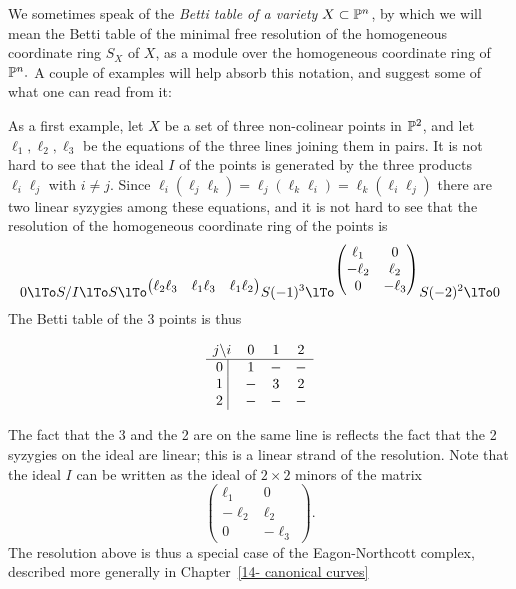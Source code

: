 \noindent We sometimes speak of the \emph{Betti table of a variety $X\subset \PP^{n}$}, by which we will mean the Betti table of the minimal free resolution
of the homogeneous coordinate ring $S_{X}$ of $X$, as a module over the homogeneous coordinate ring of $\PP^{n}.$ A couple of examples will help absorb this notation, and suggest some of what one can read from it:


\begin{example}\label{3 points in P2}
As a first example, let $X$ be a set of three non-colinear points in $\PP^2$, and let $\ell_1, \ell_2,\ell_3$ be the equations of the three
lines joining them in pairs. It is not hard to see that the ideal $I$ of the points is generated by the three products $\ell_i\ell_j$ with $i\neq j$. Since $ \ell_i(\ell_j\ell_k) = \ell_j(\ell_k\ell_i) = \ell_k(\ell_i\ell_j)$
there are two linear syzygies among these equations, and it is not hard to see that the resolution of the homogeneous coordinate ring of the points
is
$$
0\lTo S/I\lTo S
\lTo^{\begin{pmatrix}
\ell_2\ell_3&\ell_1\ell_3&\ell_1\ell_2
\end{pmatrix}}
 S(-1)^3
 \lTo^{\begin{pmatrix}
  \ell_1&0\\
  -\ell_2&\ell_2\\
 0&-\ell_3
 \end{pmatrix}}
 S(-2)^2
 \lTo 0
$$
The Betti table of the 3 points is thus
\begin{small}
$$
\begin{matrix}
j \backslash i     &0&1&2\\ \hline
\text{0 }\vline &1&-&-\\
\text{1 }\vline &-&3&2\\
\text{2 }\vline &-&-&-\\
\end{matrix}
$$
\end{small}
The fact that the 3 and the 2 are on the same line is reflects the fact that the 2 syzygies on the ideal are linear; this is a linear strand of the resolution. Note that the
ideal $I$ can be written as the ideal of $2\times 2$ minors of the matrix
$$
 {\begin{pmatrix}
  \ell_1&0\\
  -\ell_2&\ell_2\\
 0&-\ell_3
 \end{pmatrix}}.
$$
The resolution above is thus a special case of the Eagon-Northcott complex, described more generally in Chapter~\ref{14- canonical curves}
\end{example}

